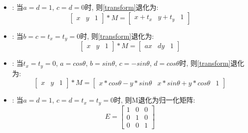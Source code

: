 {\begin {itemize}
    \item {
        {}: 当$a = d = 1$, $c = d = 0$时, 则\eqref{transform}退化为:
        \begin{equation}\label{transform_shift}
            \begin{bmatrix}
                x & y & 1
            \end{bmatrix}
            * M =
            \begin{bmatrix}
                x + t_x & y + t_y & 1
            \end{bmatrix}
        \end{equation}
    }

    \item {
        {}: 当$b = c = t_x = t_y = 0$时, 则\eqref{transform}退化为:
        \begin{equation}\label{transform_scale}
            \begin{bmatrix}
                x & y & 1
            \end{bmatrix}
            * M =
            \begin{bmatrix}
                ax & dy & 1
            \end{bmatrix}
        \end{equation}
    }

    \item {
        {}: 当$t_x = t_y = 0$, $a = cos\theta$, $b = sin\theta$, $c = -sin\theta$, $d = cos\theta$时, 则\eqref{transform}退化为:
        \begin{equation}\label{transform_rotate}
            \begin{bmatrix}
                x & y & 1
            \end{bmatrix}
            * M =
            \begin{bmatrix}
                x*cos\theta - y*sin\theta & x*sin\theta + y*cos\theta & 1
            \end{bmatrix}
         \end{equation}
    }

    \item {
        {}: 当$a = d = 1$, $c = d = t_x = t_y = 0$时, 则M退化为归一化矩阵:
        \begin{equation}\label{identity}
            E =
            \begin{bmatrix}
                1 & 0 & 0\\
                0 & 1 & 0\\
                0 & 0 & 1
            \end{bmatrix}
        \end{equation}
    }


\end{itemize}}
